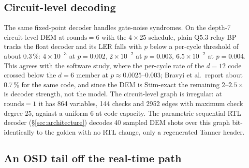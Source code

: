 \subsection*{Circuit-level decoding}

The same fixed-point decoder handles gate-noise syndromes. On the depth-7
circuit-level DEM at $\mathrm{rounds}=6$ with the $4\times25$ schedule, plain
Q5.3 relay-BP tracks the float decoder and its LER falls with $p$ below a
per-cycle threshold of about 0.3\,\%: $4\times10^{-3}$ at $p=0.002$,
$2\times10^{-2}$ at $p=0.003$, $6.5\times10^{-2}$ at $p=0.004$.
This agrees with the software study, where the per-cycle rate of the $d=12$
code crossed below the $d=6$ member at $p\approx0.0025$--$0.003$; Bravyi et
al.\ report about 0.7\,\% for the same code, and since the DEM is Stim-exact
the remaining $2$--$2.5\times$ is decoder strength, not the model.
The circuit-level graph is irregular: at $\mathrm{rounds}=1$ it has 864
variables, 144 checks and 2952 edges with maximum check degree 25, against a
uniform 6 at code capacity. The parametric sequential RTL decoder
(\S\ref{sec:architecture}) decodes 40 sampled DEM shots over this graph
bit-identically to the golden with no RTL change, only a regenerated Tanner
header.

\subsection*{An OSD tail off the real-time path}

